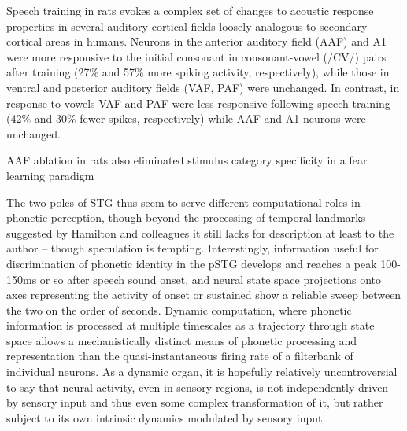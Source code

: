 Speech training in rats evokes a complex set of changes to acoustic response properties in several auditory cortical fields loosely analogous to secondary cortical areas in humans\cite{engineerSpeechTrainingAlters2015a}. Neurons in the anterior auditory field (AAF) and A1 were more responsive to the initial consonant in consonant-vowel (/CV/) pairs after training (27\% and 57\% more spiking activity, respectively), while those in ventral and posterior auditory fields (VAF, PAF) were unchanged. In contrast, in response to vowels VAF and PAF were less responsive following speech training (42\% and 30\% fewer spikes, respectively) while AAF and A1 neurons were unchanged. 

AAF ablation in rats also eliminated stimulus category specificity in a fear learning paradigm\cite{shiAnteriorAuditoryField2019}

The two poles of STG thus seem to serve different computational roles in phonetic perception, though beyond the processing of temporal landmarks suggested by Hamilton and colleagues it still lacks for description at least to the author -- though speculation is tempting\cite{hamiltonSpatialMapOnset2018a}. Interestingly, information useful for discrimination of phonetic identity in the pSTG develops and reaches a peak 100-150ms or so after speech sound onset\cite{mesgaraniPhoneticFeatureEncoding2014,changCategoricalSpeechRepresentation2010b}, and neural state space projections onto axes representing the activity of onset or sustained show a reliable sweep between the two on the order of seconds. Dynamic computation, where phonetic information is processed at multiple timescales as a trajectory through state space allows a mechanistically distinct means of phonetic processing and representation than the quasi-instantaneous firing rate of a filterbank of individual neurons. As a dynamic organ\cite{brembsBrainDynamicallyActive2020}, it is hopefully relatively uncontroversial to say that neural activity, even in sensory regions, is not independently driven by sensory input and thus even some complex transformation of it, but rather subject to its own intrinsic dynamics modulated by sensory input. 


